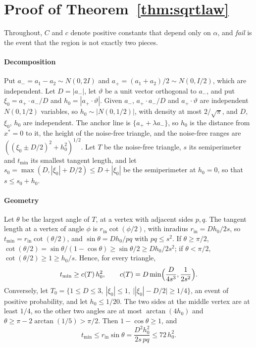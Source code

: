 \section{Proof of Theorem~\ref{thm:sqrtlaw}}\label{app:sqrt}

Throughout, $C$ and $c$ denote positive constants that depend only on $\alpha$, and \emph{fail} is the event that the
region is not exactly two pieces.

\paragraph{Decomposition} Put $a_- = a_1 - a_2 \sim N(0, 2I)$ and $a_+ = (a_1 + a_2)/2 \sim N(0, I/2)$, which are independent.
Let $D = |a_-|$, let $\vartheta$ be a unit vector orthogonal to $a_-$, and put $\xi_0 = a_+\cdot a_-/D$ and
$h_0 = |a_+\cdot\vartheta|$. Given $a_-$, $a_+\cdot a_-/D$ and $a_+\cdot\vartheta$ are independent $N(0, 1/2)$ variables, so
$h_0 \sim |N(0, 1/2)|$, with density at most $2/\sqrt\pi$, and $D$, $\xi_0$, $h_0$ are independent. The anchor line is
$\{a_+ + \lambda a_-\}$, so $h_0$ is the distance from $x^* = 0$ to it, the height of the noise-free triangle, and the
noise-free ranges are $((\xi_0 \pm D/2)^2 + h_0^2)^{1/2}$. Let $T$ be the noise-free triangle, $s$ its semiperimeter and
$t_{\min}$ its smallest tangent length, and let $s_0 = \max(D, |\xi_0| + D/2) \le D + |\xi_0|$ be the semiperimeter at
$h_0 = 0$, so that $s \le s_0 + h_0$.

\paragraph{Geometry} Let $\theta$ be the largest angle of $T$, at a vertex with adjacent sides $p, q$. The tangent length
at a vertex of angle $\phi$ is $r_{\mathrm{in}}\cot(\phi/2)$, with inradius $r_{\mathrm{in}} = Dh_0/2s$, so
$t_{\min} = r_{\mathrm{in}}\cot(\theta/2)$, and $\sin\theta = Dh_0/pq$ with $pq \le s^2$. If $\theta \ge \pi/2$,
$\cot(\theta/2) = \sin\theta/(1 - \cos\theta) \ge \sin\theta/2 \ge Dh_0/2s^2$; if $\theta < \pi/2$,
$\cot(\theta/2) \ge 1 \ge h_0/s$. Hence, for every triangle,
\begin{equation}\label{eq:tmin-lower}
t_{\min} \ge c(T)\,h_0^2, \qquad c(T) = D\min\Bigl(\frac{D}{4s^3}, \frac{1}{2s^2}\Bigr).
\end{equation}
Conversely, let $T_0 = \{1 \le D \le 3,\ |\xi_0| \le 1,\ \bigl||\xi_0| - D/2\bigr| \ge 1/4\}$, an event of positive probability,
and let $h_0 \le 1/20$. The two sides at the middle vertex are at least $1/4$, so the other two angles are at most
$\arctan(4h_0)$ and $\theta \ge \pi - 2\arctan(1/5) > \pi/2$. Then $1 - \cos\theta \ge 1$, and
\begin{equation}\label{eq:tmin-upper}
t_{\min} \le r_{\mathrm{in}}\sin\theta = \frac{D^2h_0^2}{2s\,pq} \le 72\,h_0^2 .
\end{equation}

